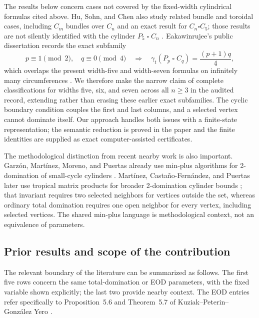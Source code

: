 \documentclass[11pt]{article}
\theoremstyle{definition}
\newcommand{\gt}{\gamma_t}
\newcommand{\sq}{\mathbin{\square}}
\begin{document}
The results below concern cases not covered by the fixed-width cylindrical
formulas cited above. Hu, Sohn, and Chen also study related bundle and
toroidal cases, including \(C_m\) bundles over \(C_n\) and an exact result
for \(C_n\square C_5\); those results are not silently identified with the
cylinder \(P_5\sq C_n\) \cite{HuSohnChen2016}. Eakawinrujee's public
dissertation records the exact subfamily
\[
p\equiv1\pmod2,\quad q\equiv0\pmod4
\quad\Longrightarrow\quad
\gt(P_p\sq C_q)=\frac{(p+1)q}{4},
\]
which overlaps the present width-five and width-seven formulas on infinitely
many circumferences \cite{EakawinrujeeThesis2023}. We therefore make the
narrow claim of complete classifications for widths five, six, and seven
across all $n\ge3$ in the audited record, extending rather than erasing these
earlier exact subfamilies. The cyclic boundary condition couples the first and
last columns, and a selected vertex cannot dominate itself. Our approach
handles both issues with a finite-state representation; the semantic reduction
is proved in the paper and the finite identities are supplied as exact
computer-assisted certificates.

The methodological distinction from recent nearby work is also important.
Garzón, Martínez, Moreno, and Puertas already use min-plus algorithms for
2-domination of small-cycle cylinders \cite{GarzonMartinezMorenoPuertas2021}.
Martínez, Castaño-Fernández, and Puertas later use tropical matrix products
for broader 2-domination cylinder bounds
\cite{MartinezCastanoPuertas2024}; that invariant requires two selected
neighbors for vertices outside the set, whereas ordinary total domination
requires one open neighbor for every vertex, including selected vertices. The
shared min-plus language is methodological context, not an equivalence of
parameters.

\subsection{Prior results and scope of the contribution}

The relevant boundary of the literature can be summarized as follows. The
first five rows concern the same total-domination or EOD parameters, with
the fixed variable shown explicitly; the last two provide nearby context.
The EOD entries refer specifically to Proposition~5.6 and Theorem~5.7 of
Kuziak--Peterin--González Yero \cite{KuziakPeterinGonzalezYero2014}.
\end{document}
